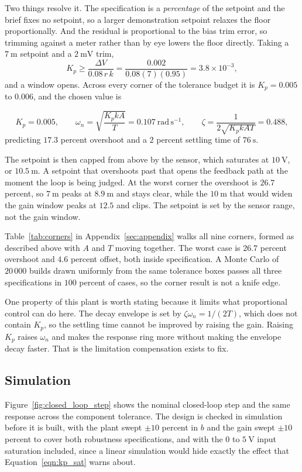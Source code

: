 Two things resolve it. The specification is a \emph{percentage} of the setpoint and the brief
fixes no setpoint, so a larger demonstration setpoint relaxes the floor proportionally. And the
residual is proportional to the bias trim error, so trimming against a meter rather than by eye
lowers the floor directly. Taking a $7\ \mathrm{m}$ setpoint and a $2\ \mathrm{mV}$ trim,
\begin{equation}\label{eqn:kp_floor}
    K_p \ge \frac{\Delta V}{0.08\,r\,k} = \frac{0.002}{0.08(7)(0.95)} = 3.8 \times 10^{-3} ,
\end{equation}
and a window opens. Across every corner of the tolerance budget it is $K_p = 0.005$ to $0.006$,
and the chosen value is

\begin{equation}
    K_p = 0.005 , \qquad
    \omega_n = \sqrt{\frac{K_p k A}{T}} = 0.107\ \mathrm{rad\,s^{-1}} , \qquad
    \zeta = \frac{1}{2\sqrt{K_p k A T}} = 0.488 ,
\end{equation}
predicting $17.3$ percent overshoot and a $2$ percent settling time of $76\ \mathrm{s}$.

The setpoint is then capped from above by the sensor, which saturates at $10\ \mathrm{V}$, or
$10.5\ \mathrm{m}$. A setpoint that overshoots past that opens the feedback path at the moment the
loop is being judged. At the worst corner the overshoot is $26.7$ percent, so $7\ \mathrm{m}$
peaks at $8.9\ \mathrm{m}$ and stays clear, while the $10\ \mathrm{m}$ that would widen the gain
window peaks at $12.5$ and clips. The setpoint is set by the sensor range, not the gain window.

Table~\ref{tab:corners} in Appendix~\ref{sec:appendix} walks all nine corners, formed as described
above with $A$ and $T$ moving together. The worst case is $26.7$ percent overshoot and $4.6$
percent offset, both inside specification. A Monte Carlo of $20\,000$ builds drawn uniformly from
the same tolerance boxes passes all three specifications in $100$ percent of cases, so the corner
result is not a knife edge.

One property of this plant is worth stating because it limits what proportional control can do
here. The decay envelope is set by $\zeta\omega_n = 1/(2T)$, which does not contain $K_p$, so
the settling time cannot be improved by raising the gain. Raising $K_p$ raises $\omega_n$ and
makes the response ring more without making the envelope decay faster. That is the limitation
compensation exists to fix.

\subsection{Simulation}
Figure~\ref{fig:closed_loop_step} shows the nominal closed-loop step and the same response
across the component tolerance. The design is checked in simulation before it is built, with the plant swept $\pm 10$ percent in
$b$ and the gain swept $\pm 10$ percent to cover both robustness specifications, and with the
$0$ to $5\ \mathrm{V}$ input saturation included, since a linear simulation would hide exactly
the effect that Equation~\eqref{eqn:kp_sat} warns about.

